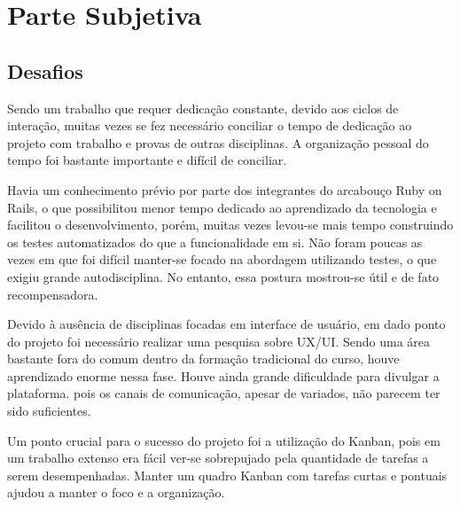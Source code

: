 \chapter{Parte Subjetiva}
\label{cap:partesubjetiva}

\section{Desafios}
\par Sendo um trabalho que requer dedicação constante, devido aos ciclos de interação, muitas vezes se fez necessário conciliar o tempo de dedicação ao projeto com trabalho e provas de outras disciplinas. A organização pessoal do tempo foi bastante importante e difícil de conciliar.
\par Havia um conhecimento prévio por parte dos integrantes do arcabouço Ruby on Rails, o que possibilitou menor tempo dedicado ao aprendizado da tecnologia e facilitou o desenvolvimento, porém, muitas vezes levou-se mais tempo construindo os testes automatizados do que a funcionalidade em si. Não foram poucas as vezes em que foi difícil manter-se focado na abordagem utilizando testes, o que exigiu grande autodisciplina. No entanto, essa postura mostrou-se útil e de fato recompensadora.
\par Devido à ausência de disciplinas focadas em interface de usuário, em dado ponto do projeto foi necessário realizar uma pesquisa sobre UX/UI. Sendo uma área bastante fora do comum dentro da formação tradicional do curso, houve aprendizado enorme nessa fase. Houve ainda grande dificuldade para divulgar a plataforma. pois os canais de comunicação, apesar de variados, não parecem ter sido suficientes.
\par Um ponto crucial para o sucesso do projeto foi a utilização do Kanban, pois em um trabalho extenso era fácil ver-se sobrepujado pela quantidade de tarefas a serem desempenhadas. Manter um quadro Kanban com tarefas curtas e pontuais ajudou a manter o foco e a organização.

